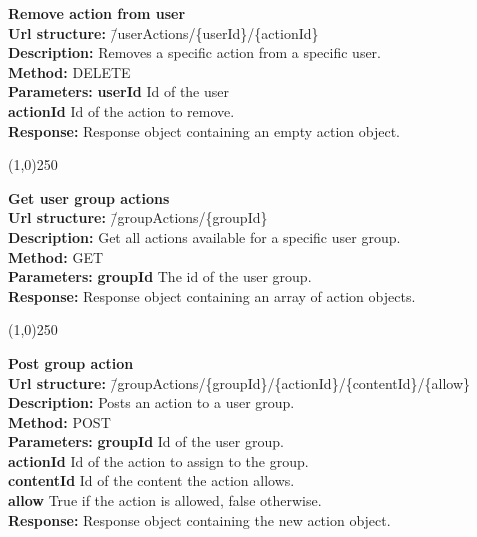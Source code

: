 \documentclass[11pt]{article}
\begin{document}
\begin{tabbing}
\textbf{Remove action from user} \\
\textcolor{black!60}{\textbf{Url structure:}} \hspace{0.2in} \= /userActions/\{userId\}/\{actionId\} \\
\textcolor{black!60}{\textbf{Description:}}  \> Removes a specific action from a specific user. \\
\textcolor{black!60}{\textbf{Method:}} \> DELETE \\
\textcolor{black!60}{\textbf{Parameters:}} \> \textbf{userId} Id of the user \\
\> \textbf{actionId} Id of the action to remove. \\
\textcolor{black!60}{\textbf{Response:}} \> Response object containing an empty action object.
\end{tabbing}

\begin{center}\line(1,0){250}\end{center}

\begin{tabbing}
\textbf{Get user group actions} \\
\textcolor{black!60}{\textbf{Url structure:}} \hspace{0.2in} \= /groupActions/\{groupId\} \\
\textcolor{black!60}{\textbf{Description:}}  \> Get all actions available for a specific user group. \\
\textcolor{black!60}{\textbf{Method:}} \> GET \\
\textcolor{black!60}{\textbf{Parameters:}} \> \textbf{groupId} The id of the user group. \\
\textcolor{black!60}{\textbf{Response:}} \> Response object containing an array of action objects.
\end{tabbing}

\begin{center}\line(1,0){250}\end{center}

\begin{tabbing}
\textbf{Post group action} \\
\textcolor{black!60}{\textbf{Url structure:}} \hspace{0.2in} \= /groupActions/\{groupId\}/\{actionId\}/\{contentId\}/\{allow\} \\
\textcolor{black!60}{\textbf{Description:}}  \> Posts an action to a user group. \\
\textcolor{black!60}{\textbf{Method:}} \> POST \\
\textcolor{black!60}{\textbf{Parameters:}} \> \textbf{groupId} Id of the user group. \\
\> \textbf{actionId} Id of the action to assign to the group. \\
\> \textbf{contentId} Id of the content the action allows. \\
\> \textbf{allow} True if the action is allowed, false otherwise. \\
\textcolor{black!60}{\textbf{Response:}} \> Response object containing the new action object.
\end{tabbing}
\end{document}
